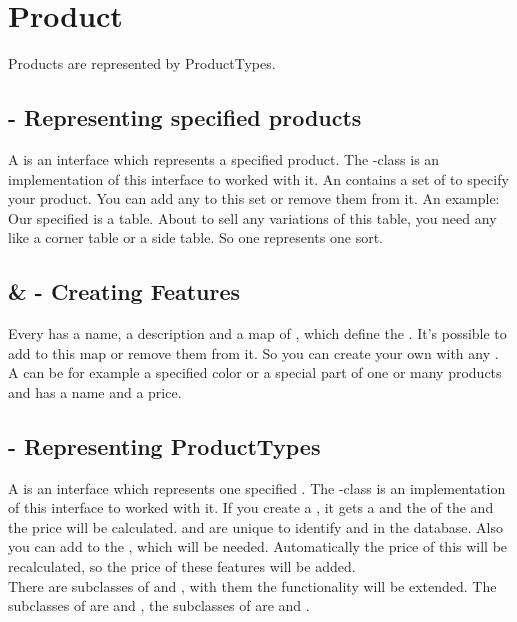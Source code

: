 \section{Product}

Products are represented by ProductTypes.

\subsection{ - Representing specified products}
A  is an interface which represents a specified product. The -class is an implementation of this interface to worked with it.
An  contains a set of  to specify your product. You can add any   to this set or remove them from it.
An example: Our specified  is a table. About to sell any variations of this table, you need any  like a corner table or a side table. 
So one  represents one sort.

\subsection{ &  - Creating Features}
Every  has a name, a description and a map of , which define the . It's possible to add 
 to this map or remove them from it. So you can create your own  with any .\\
A  can be for example a specified color or a special part of one or many products and has a name and a price.   

\subsection{ - Representing ProductTypes}
A  is an interface which represents one specified . The -class is an implementation of this interface to worked with it.
If you create a , it gets a  and the  of the  and the price will be calculated.
 and  are unique  to identify  and  in the database. 
Also you can add  to the , which will be needed. Automatically the price of this  will be recalculated, 
so the price of these features will be added.\\
There are subclasses of  and , with them the functionality will be extended. The subclasses of  are  and 
, the subclasses of  are  and . 

